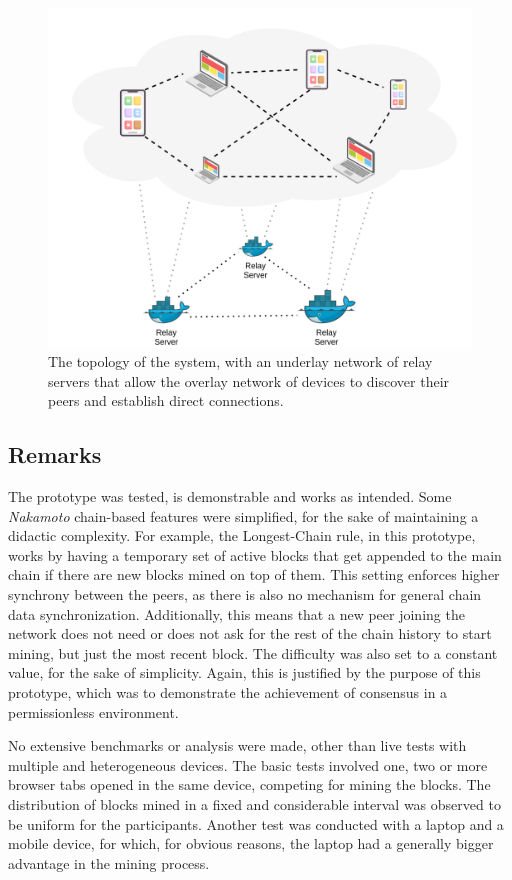 \documentclass[journal]{IEEEtran}
\begin{document}
\begin{figure}[h]
  \centering
  \includegraphics[width=\columnwidth]{in-browser-pow-topology}
  \caption{The topology of the system, with an underlay network of relay servers that allow the overlay network of devices to discover their peers and establish direct connections.}
  \label{fig:in-browser-pow-topology}
\end{figure}

\subsection{Remarks}

The prototype was tested, is demonstrable and works as intended. Some \emph{Nakamoto} chain-based
features were simplified, for the sake of maintaining a didactic complexity. For example, 
the Longest-Chain rule, in this prototype, works by having a temporary set of active blocks 
that get appended to the main chain if there are new blocks mined on top
of them. This setting enforces higher synchrony between the peers, as there is also no mechanism for
general chain data synchronization. Additionally, this means that a new peer joining the network does not
need or does not ask for the rest of the chain history to start mining, but just the most recent block.
The difficulty was also set to a constant value, for the sake of simplicity.
Again, this is justified by the purpose of this prototype, which was to demonstrate the achievement
of consensus in a permissionless environment.

No extensive benchmarks or analysis were made, other than live tests with multiple
and heterogeneous devices. The basic tests involved one, two or more browser tabs
opened in the same device, competing for mining the blocks. The distribution of blocks mined
in a fixed and considerable interval was observed to be uniform for the participants. Another test was
conducted with a laptop and a mobile device, for which, for obvious reasons, the laptop
had a generally bigger advantage in the mining process.
\end{document}
